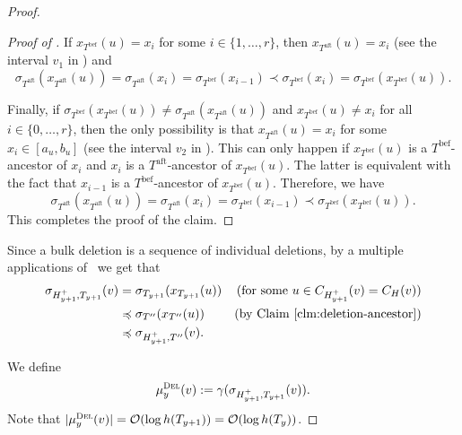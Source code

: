 \documentclass[kpfonts]{patmorin}
\newcommand{\Oh}{\mathcal{O}}
\let\preceq\preccurlyeq
\begin{document}
\begin{proof}
\begin{proof}[Proof of ]
    If $x_{T^{\text{bef}}}(u)=x_i$ for some $i\in\{1,\ldots,r\}$, 
    then $x_{T^{\text{aft}}}(u)=x_i$ (see the interval $v_1$ in ) and 
    \[
    \sigma_{T^{\text{aft}}}(x_{T^{\text{aft}}}(u))= \sigma_{T^{\text{aft}}}(x_i) = \sigma_{T^{\text{bef}}}(x_{i-1}) \prec \sigma_{T^{\text{bef}}}(x_{i}) = \sigma_{T^{\text{bef}}}(x_{T^{\text{bef}}}(u)).\]

    Finally, if $\sigma_{T^{\text{bef}}}(x_{T^{\text{bef}}}(u))\neq \sigma_{T^{\text{aft}}}(x_{T^{\text{aft}}}(u))$ and
    $x_{T^{\text{bef}}}(u)\neq x_i$ for all $i\in\{0,\ldots,r\}$, 
    then the only possibility is that $x_{T^{\text{aft}}}(u)=x_i$ for some $x_i\in [a_u,b_u]$ (see the interval $v_2$ in ). 
    This can only happen if $x_{T^{\text{bef}}}(u)$ is a $T^{\text{bef}}$-ancestor of $x_i$ and $x_i$ is a $T^{\text{aft}}$-ancestor of $x_{T^{\text{bef}}}(u)$. 
    The latter is equivalent with the fact that $x_{i-1}$ is a $T^{\text{bef}}$-ancestor of $x_{T^{\text{bef}}}(u)$.
    Therefore, we have
    \[
    \sigma_{T^{\text{aft}}}(x_{T^{\text{aft}}}(u)) = \sigma_{T^{\text{aft}}}(x_i) = 
    \sigma_{T^{\text{bef}}}(x_{i-1}) \prec \sigma_{T^{\text{bef}}}(x_{T^{\text{bef}}}(u)).
    \]
    This completes the proof of the claim.
  \end{proof}

Since a bulk deletion is a sequence of individual deletions, by a multiple applications of~ we get that 
  \begin{align*}
    \sigma_{H^+_{y+1},T_{y+1}}(v)
      & = \sigma_{T_{y+1}}(x_{T_{y+1}}(u)) & \text{(for some $u\in C_{H^+_{y+1}}(v)=C_H(v)$)} \\
      & \preceq \sigma_{T''}(x_{T''}(u)) & \text{(by \clmref{deletion-ancestor})} \\
      & \preceq \sigma_{H^+_{y+1},T''}(v). %
  \end{align*}

We define 
  \[\mu_y^{\textsc{Del}}(v) := \gamma(\sigma_{H^{+}_{y+1},T_{y+1}}(v)).
  \]
Note that $|\mu_y^{\textsc{Del}}(v)| = \Oh(\log h(T_{y+1})) = \Oh(\log h(T_y))$.


\end{proof}
\end{document}

